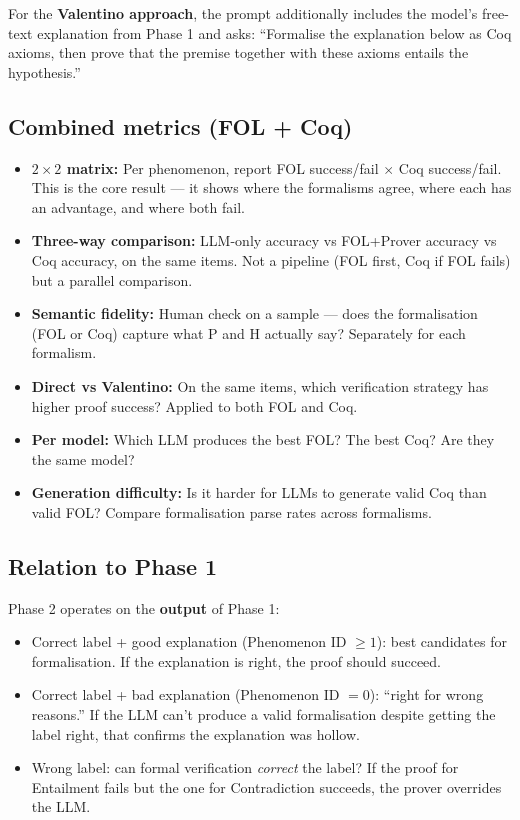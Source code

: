 \documentclass[11pt,a4paper]{article}
\begin{document}
For the \textbf{Valentino approach}, the prompt additionally includes the model's free-text explanation from Phase 1 and asks: ``Formalise the explanation below as Coq axioms, then prove that the premise together with these axioms entails the hypothesis.''

\subsection{Combined metrics (FOL + Coq)}

\begin{itemize}[nosep,leftmargin=1.5em]
\item \textbf{$2 \times 2$ matrix:} Per phenomenon, report FOL success/fail $\times$ Coq success/fail. This is the core result --- it shows where the formalisms agree, where each has an advantage, and where both fail.
\item \textbf{Three-way comparison:} LLM-only accuracy vs FOL+Prover accuracy vs Coq accuracy, on the same items. Not a pipeline (FOL first, Coq if FOL fails) but a parallel comparison.
\item \textbf{Semantic fidelity:} Human check on a sample --- does the formalisation (FOL or Coq) capture what P and H actually say? Separately for each formalism.
\item \textbf{Direct vs Valentino:} On the same items, which verification strategy has higher proof success? Applied to both FOL and Coq.
\item \textbf{Per model:} Which LLM produces the best FOL? The best Coq? Are they the same model?
\item \textbf{Generation difficulty:} Is it harder for LLMs to generate valid Coq than valid FOL? Compare formalisation parse rates across formalisms.
\end{itemize}

\subsection{Relation to Phase 1}

Phase 2 operates on the \textbf{output} of Phase 1:

\begin{itemize}[nosep,leftmargin=1.5em]
\item Correct label + good explanation (Phenomenon ID $\geq 1$): best candidates for formalisation. If the explanation is right, the proof should succeed.
\item Correct label + bad explanation (Phenomenon ID $= 0$): ``right for wrong reasons.'' If the LLM can't produce a valid formalisation despite getting the label right, that confirms the explanation was hollow.
\item Wrong label: can formal verification \emph{correct} the label? If the proof for Entailment fails but the one for Contradiction succeeds, the prover overrides the LLM.
\end{itemize}
\end{document}
